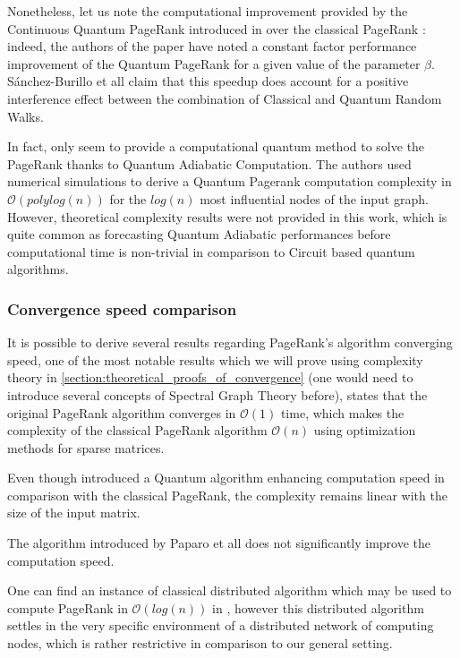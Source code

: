\documentclass{article}
\begin{document}
Nonetheless, let us note the computational improvement provided by the Continuous Quantum PageRank introduced in \cite{sánchez-burillo_duch_gómez-gardeñes_zueco_2012} over the classical PageRank : indeed, the authors of the paper have noted a constant factor performance improvement of the Quantum PageRank for a given value of the parameter $\beta$. Sánchez-Burillo et all claim that this speedup does account for a positive interference effect between the combination of Classical and Quantum Random Walks.

In fact, only \cite{garnerone_zanardi_lidar_2012} seem to provide a computational quantum method to solve the PageRank thanks to Quantum Adiabatic Computation. The authors used numerical simulations to derive a Quantum Pagerank computation complexity in $\mathcal{O}(polylog(n))$ for the $log(n)$ most influential nodes of the input graph. However, theoretical complexity results were not provided in this work, which is quite common as forecasting Quantum Adiabatic performances before computational time is non-trivial in comparison to Circuit based quantum algorithms.

\subsubsection{Convergence speed comparison}
It is possible to derive several results regarding PageRank's algorithm converging speed, one of the most notable results which we will prove using complexity theory in \ref{section:theoretical_proofs_of_convergence} (one would need to introduce several concepts of Spectral Graph Theory before), states that the original PageRank algorithm converges in $\mathcal{O}(1)$ time, which makes the complexity of the classical PageRank algorithm $\mathcal{O}(n)$ using optimization methods for sparse matrices.

Even though \cite{sánchez-burillo_duch_gómez-gardeñes_zueco_2012} introduced a Quantum algorithm enhancing computation speed in comparison with the classical PageRank, the complexity remains linear with the size of the input matrix.

The algorithm introduced by Paparo et all  \cite{paparo_martin-delgado_2012} does not significantly improve the computation speed.

One can find an instance of classical distributed algorithm which may be used to compute PageRank in $\mathcal{O}(log(n))$ in \cite{sarma_molla_pandurangan_upfal_2013}, however this distributed algorithm settles in the very specific environment of a distributed network of computing nodes, which is rather restrictive in comparison to our general setting.
\end{document}
